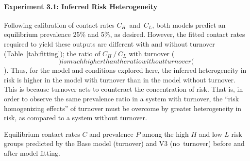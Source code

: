 \paragraph{Experiment 3.1: Inferred Risk Heterogeneity}
Following calibration of contact rates $C_H$~and~$C_L$,
both models predict an equilibrium prevalence 25\% and 5\%, as desired.
However, the fitted contact rates required to yield these outputs
are different with and without turnover (Table~\ref{tab:fitting});
the ratio of $C_H~/~C_L$ with turnover
($$)
is much higher than the ratio without turnover
($$).
Thus, for the model and conditions explored here,
the inferred heterogeneity in risk
is higher in the model with turnover than in the model without turnover.
This is because turnover acts to counteract the concentration of risk.
That is, in order to observe the same prevalence ratio in a system with turnover,
the ``risk homogenizing effects'' of turnover must be overcome by
greater heterogeneity in risk, as compared to a system without turnover.
\begin{table}
  \centering
  \caption{Equilibrium contact rates $C$ and prevalence $P$
    among the high $H$ and low $L$ risk groups
    predicted by the Base model (turnover) and V3 (no~turnover)
    before and after model fitting.}
  \label{tab:fitting}
  
\end{table}
